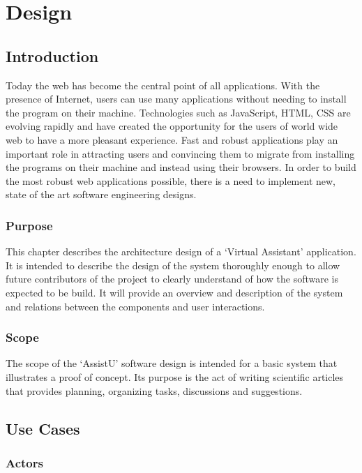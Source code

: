 \chapter{Design}

\section{Introduction} %
\label{sec:introduction}

Today the web has become the central point of all applications. With the presence of Internet, users can use many applications without needing to 
install the program on their machine. Technologies such as JavaScript, HTML, CSS are evolving rapidly and have created the opportunity for the users of 
world wide web to have a more pleasant experience. Fast and robust applications play an important role in attracting users and convincing them to 
migrate from installing the programs on their machine and instead using their browsers. In order to build the most robust web applications possible, 
there is a need to implement new, state of the art software engineering designs.

\subsection{Purpose} %
\label{sub:purpose}

This chapter describes the architecture design of a `Virtual Assistant' application. It is intended to describe the design of the system 
thoroughly enough to allow future contributors of the project to clearly understand of how the software is expected to be build. It will provide 
an overview and description of the system and relations between the components and user interactions. 

\subsection{Scope} %
\label{sub:scope}
The scope of the `AssistU' software design is intended for a basic system that illustrates a proof of concept. Its purpose is the act of writing 
scientific articles that provides planning, organizing tasks, discussions and suggestions.

\section{Use Cases} %
\label{sec:system_overview}
\subsection{Actors} %
\label{sub:actors}
